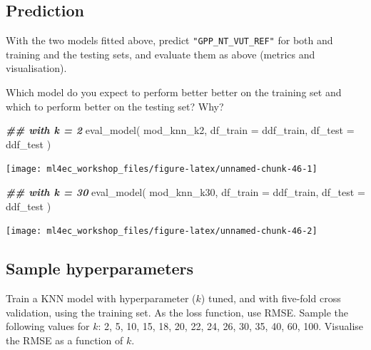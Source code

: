 \documentclass[
]{book}
\newenvironment{Shaded}{\begin{snugshade}}{\end{snugshade}}
\newcommand{\AttributeTok}[1]{\textcolor[rgb]{0.77,0.63,0.00}{#1}}
\newcommand{\DocumentationTok}[1]{\textcolor[rgb]{0.56,0.35,0.01}{\textbf{\textit{#1}}}}
\newcommand{\FunctionTok}[1]{\textcolor[rgb]{0.00,0.00,0.00}{#1}}
\newcommand{\NormalTok}[1]{#1}
\begin{document}
\hypertarget{prediction-4}{%
\subsection{Prediction}\label{prediction-4}}

With the two models fitted above, predict \texttt{"GPP\_NT\_VUT\_REF"} for both and training and the testing sets, and evaluate them as above (metrics and visualisation).

Which model do you expect to perform better better on the training set and which to perform better on the testing set? Why?

\begin{Shaded}
\begin{Highlighting}[]
\DocumentationTok{\#\# with k = 2}
\FunctionTok{eval\_model}\NormalTok{(}
\NormalTok{  mod\_knn\_k2, }
  \AttributeTok{df\_train =}\NormalTok{ ddf\_train, }
  \AttributeTok{df\_test =}\NormalTok{ ddf\_test}
\NormalTok{  )}
\end{Highlighting}
\end{Shaded}

\begin{center}\texttt{[image: ml4ec\_workshop\_files/figure-latex/unnamed-chunk-46-1]} \end{center}

\begin{Shaded}
\begin{Highlighting}[]
\DocumentationTok{\#\# with k = 30}
\FunctionTok{eval\_model}\NormalTok{(}
\NormalTok{  mod\_knn\_k30, }
  \AttributeTok{df\_train =}\NormalTok{ ddf\_train, }
  \AttributeTok{df\_test =}\NormalTok{ ddf\_test}
\NormalTok{  )}
\end{Highlighting}
\end{Shaded}

\begin{center}\texttt{[image: ml4ec\_workshop\_files/figure-latex/unnamed-chunk-46-2]} \end{center}

\hypertarget{sample-hyperparameters-1}{%
\subsection{Sample hyperparameters}\label{sample-hyperparameters-1}}

Train a KNN model with hyperparameter (\(k\)) tuned, and with five-fold cross validation, using the training set. As the loss function, use RMSE. Sample the following values for \(k\): 2, 5, 10, 15, 18, 20, 22, 24, 26, 30, 35, 40, 60, 100. Visualise the RMSE as a function of \(k\).
\end{document}
